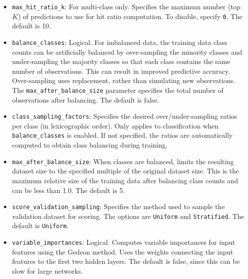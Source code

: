 {{{\begin{itemize}
\item \texttt{max\_hit\_ratio\_k}: For multi-class only. Specifies the maximum number (top $K$) of predictions to use for hit ratio computation. To disable, specify \texttt{0}. The default is 10.

\item \texttt{balance\_classes}: Logical. For imbalanced data, the training data class counts can be artificially balanced by over-sampling the minority classes and under-sampling the majority classes so that each class  contains the same number of observations.  This can result in improved predictive accuracy.  Over-sampling  uses replacement, rather than simulating new observations. The \texttt{max\_after\_balance\_size} parameter specifies the total number of observations after balancing. The default is false.

\item \texttt{class\_sampling\_factors}: Specifies the desired over/under-sampling ratios per class (in lexicographic order). Only applies to classification when \texttt{balance\_classes} is enabled. If not specified, the ratios are automatically computed to obtain class balancing during training.

\item \texttt{max\_after\_balance\_size}: When classes are balanced, limits the resulting dataset size to the specified multiple of the original dataset size. This is the maximum relative size of the training data after balancing class counts and can be less than 1.0. The default is 5.

\item \texttt{score\_validation\_sampling}: Specifies the method used to sample the validation dataset for scoring. The options are \texttt{Uniform} and \texttt{Stratified}. The default is \texttt{Uniform}.


\item \texttt{variable\_importances}: Logical. Computes variable importances for input features using the Gedeon method. Uses the weights connecting the input features to the first two hidden layers. The default is false, since this can be slow for large networks. 


\end{itemize}}}}
